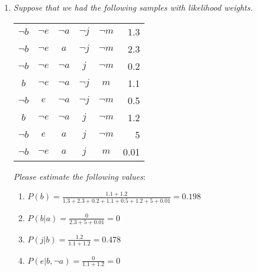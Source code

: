 \documentclass[fleqn]{hw7}
\begin{document}
\begin{enumerate}
\item \textit{Suppose that we had the following samples with likelihood weights.}

\begin{tabular}[h]{cccccr}
\(\lnot b \) & \(\lnot e \) & \(\lnot a \) & \(\lnot j \) & \(\lnot m \) &\hspace{2cm} 1.3\\
\(\lnot b \) & \(\lnot e \) & \( a \) & \( \lnot j \) & \(\lnot m \) &\hspace{2cm} 2.3\\
\(\lnot b \) & \(\lnot e \) & \(\lnot a \) & \(  j \) & \(\lnot m \) &\hspace{2cm} 0.2\\
\(b \) & \( \lnot e \) & \(  \lnot a \) & \(\lnot j \) & \( m \) &\hspace{2cm} 1.1\\
\(\lnot b \) & \(e \) & \(\lnot a \) & \(\lnot j \) & \(\lnot m\) &\hspace{2cm} 0.5\\
\(b \) & \(\lnot e  \) & \(\lnot a \) & \(j \) & \(\lnot m\) &\hspace{2cm} 1.2\\
\(\lnot b \) & \( e \) & \(  a \) & \(   j \) & \(\lnot m\) &\hspace{2cm} 5\\
\(\lnot b \) & \(\lnot e \) & \( a \) & \(  j \) & \( m\) &\hspace{2cm} 0.01
\end{tabular}

\textit{Please estimate the following values}:
\begin{enumerate}
\item $\displaystyle P(b) = \frac{1.1 + 1.2}{1.3 + 2.3 + 0.2 +1.1 + 0.5 + 1.2 + 5 + 0.01} = \boxed{0.198} $
\item $\displaystyle P(b|a) = \frac{0}{2.3 + 5 + 0.01} = \boxed{0} $
\item $\displaystyle P(j|b) = \frac{1.2}{1.1 + 1.2} = \boxed{0.478} $
\item $\displaystyle P(e|b, \lnot a) = \frac{0}{1.1 + 1.2} = \boxed{0} $
\end{enumerate}

\newpage %


\end{enumerate}
\end{document}
